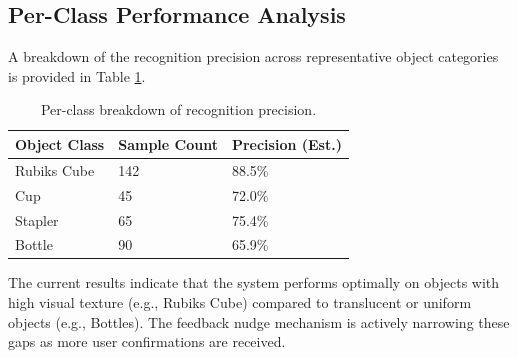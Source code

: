 \documentclass[12pt,a4paper]{report}
\begin{document}
\subsection{Per-Class Performance Analysis}
A breakdown of the recognition precision across representative object categories is provided in Table \ref{tab:class_breakdown}.

\begin{table}[H]
    \caption{Per-class breakdown of recognition precision.}
    \label{tab:class_breakdown}
    \vspace{0.5em}
    \centering
    \renewcommand{\arraystretch}{1.3}
    \small
    \begin{tabular}{|l|l|l|}
        \hline
        \textbf{Object Class} & \textbf{Sample Count} & \textbf{Precision (Est.)} \\
        \hline
        Rubiks Cube & 142 & 88.5\% \\
        \hline
        Cup & 45 & 72.0\% \\
        \hline
        Stapler & 65 & 75.4\% \\
        \hline
        Bottle & 90 & 65.9\% \\
        \hline
    \end{tabular}
\end{table}

The current results indicate that the system performs optimally on objects with high visual texture (e.g., Rubiks Cube) compared to translucent or uniform objects (e.g., Bottles). The feedback nudge mechanism is actively narrowing these gaps as more user confirmations are received.
\end{document}
